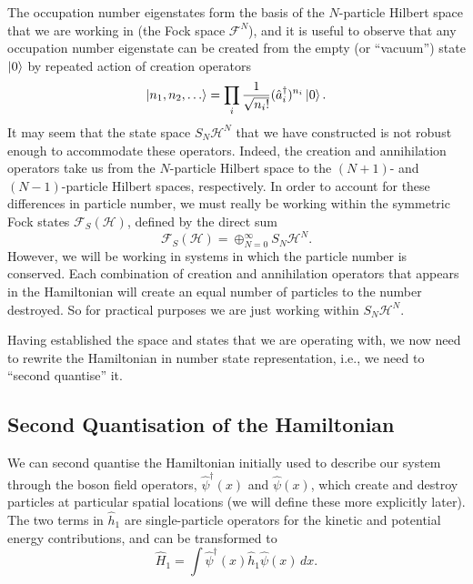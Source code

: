 \documentclass[a4paper, 10pt]{article}
\theoremstyle{plain}
\begin{document}
The occupation number eigenstates form the basis of the $N$-particle Hilbert
space that we are working in (the Fock space $\mathcal{F}^N$), and it is useful
to observe that any occupation number eigenstate can be created from the empty
(or ``vacuum'') state $\ket{0}$ by repeated action of
creation operators \cite{Altland2010}
\begin{equation}
    \ket{n_{1}, n_{2}, \dots}
    =
    \prod_{i}{\frac{1}{\sqrt{n_{i}!}}(\hat{a}_i^{\dagger})^{n_{i}}} \ket{0}.
\end{equation}
It may seem that the state space $S_{N}\mathcal{H}^N$ that we have constructed
is not robust enough to accommodate these operators. Indeed, the creation and
annihilation operators take us from the $N$-particle Hilbert space to the
$(N+1)$- and $(N-1)$-particle Hilbert spaces, respectively. In order to account
for these differences in particle number, we must really be working within the
symmetric Fock states $\mathcal{F}_{S}(\mathcal{H})$, defined by the direct sum
\cite{Blank1999}
\begin{equation}
    \mathcal{F}_{S}(\mathcal{H}) = \oplus_{N=0}^\infty S_{N} \mathcal{H}^N.
\end{equation}
However, we will be working in systems in which the particle number is
conserved. Each combination of creation and annihilation operators that appears
in the Hamiltonian will create an equal number of particles to the number
destroyed. So for practical purposes we are just working within $S_{N}
\mathcal{H}^{N}$.

Having established the space and states that we are operating with, we now need
to rewrite the Hamiltonian in number state representation, i.e., we need to
``second quantise'' it.


\subsection{Second Quantisation of the Hamiltonian}

We can second quantise the Hamiltonian initially used to describe our system
through the boson field operators, $\hat{\psi}^{\dagger}(x)$ and
$\hat{\psi}(x)$, which create and destroy particles at particular spatial
locations (we will define these more explicitly later). The two terms in
$\hat{h}_1$ are single-particle operators for the kinetic and potential energy
contributions, and can be transformed to
\begin{equation}
    \hat{H}_{1}
    =
    \int{\hat{\psi}^{\dagger}(x) \hat{h}_{1} \hat{\psi}(x) \,dx}.
\end{equation}
\end{document}
